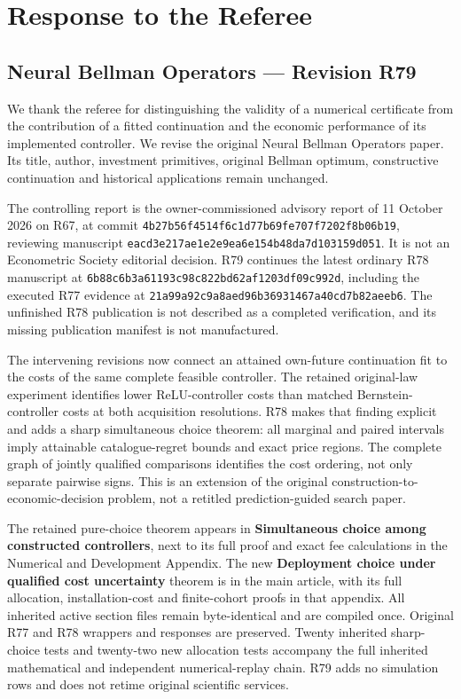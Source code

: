 \hypertarget{response-to-the-referee}{%
\section{Response to the Referee}\label{response-to-the-referee}}

\hypertarget{neural-bellman-operators-revision-r79}{%
\subsection{Neural Bellman Operators --- Revision
R79}\label{neural-bellman-operators-revision-r79}}

We thank the referee for distinguishing the validity of a numerical
certificate from the contribution of a fitted continuation and the
economic performance of its implemented controller. We revise the
original Neural Bellman Operators paper. Its title, author, investment
primitives, original Bellman optimum, constructive continuation and
historical applications remain unchanged.

The controlling report is the owner-commissioned advisory report of 11
October 2026 on R67, at commit
\texttt{4b27b56f4514f6c1d77b69fe707f7202f8b06b19}, reviewing manuscript
\texttt{eacd3e217ae1e2e9ea6e154b48da7d103159d051}. It is not an
Econometric Society editorial decision. R79 continues the latest
ordinary R78 manuscript at
\texttt{6b88c6b3a61193c98c822bd62af1203df09c992d}, including the
executed R77 evidence at
\texttt{21a99a92c9a8aed96b36931467a40cd7b82aeeb6}. The unfinished R78
publication is not described as a completed verification, and its
missing publication manifest is not manufactured.

The intervening revisions now connect an attained own-future
continuation fit to the costs of the same complete feasible controller.
The retained original-law experiment identifies lower ReLU-controller
costs than matched Bernstein-controller costs at both acquisition
resolutions. R78 makes that finding explicit and adds a sharp
simultaneous choice theorem: all marginal and paired intervals imply
attainable catalogue-regret bounds and exact price regions. The complete
graph of jointly qualified comparisons identifies the cost ordering, not
only separate pairwise signs. This is an extension of the original
construction-to-economic-decision problem, not a retitled
prediction-guided search paper.

The retained pure-choice theorem appears in \textbf{Simultaneous choice
among constructed controllers}, next to its full proof and exact fee
calculations in the Numerical and Development Appendix. The new
\textbf{Deployment choice under qualified cost uncertainty} theorem is
in the main article, with its full allocation, installation-cost and
finite-cohort proofs in that appendix. All inherited active section
files remain byte-identical and are compiled once. Original R77 and R78
wrappers and responses are preserved. Twenty inherited sharp-choice
tests and twenty-two new allocation tests accompany the full inherited
mathematical and independent numerical-replay chain. R79 adds no
simulation rows and does not retime original scientific services.

